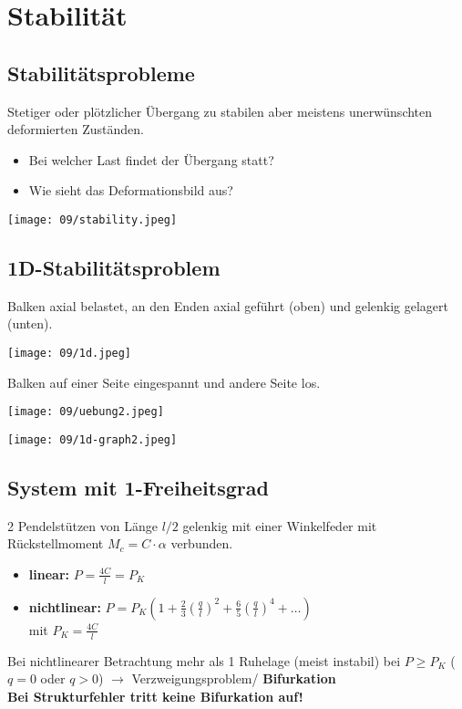 \section{Stabilität}
    \subsection{Stabilitätsprobleme}
        Stetiger oder plötzlicher Übergang zu stabilen aber meistens unerwünschten deformierten Zuständen.\vspace{-1mm}
        \begin{itemize}
            \item Bei welcher Last findet der Übergang statt?
            \item Wie sieht das Deformationsbild aus?
        \end{itemize}
        \begin{center}
            \texttt{[image: 09/stability.jpeg]}
        \end{center}
    \subsection{1D-Stabilitätsproblem}
        Balken axial belastet, an den Enden axial geführt (oben) und gelenkig gelagert (unten).
        \begin{center}
            \texttt{[image: 09/1d.jpeg]}
        \end{center}
\columnbreak
        Balken auf einer Seite eingespannt und andere Seite los.
        \begin{center}
            \texttt{[image: 09/uebung2.jpeg]}
        \end{center}
        \begin{center}
             \texttt{[image: 09/1d-graph2.jpeg]}
        \end{center}
        
    \subsection{System mit 1-Freiheitsgrad}
        2 Pendelstützen von Länge $l/2$ gelenkig mit einer Winkelfeder mit Rückstellmoment $M_c=C\cdot\alpha$ verbunden.
        \begin{itemize}
            \item \textbf{linear:} $P=\frac{4C}{l}=P_K$
            \item \textbf{nichtlinear:} $P=P_K\left(1+\frac{2}{3}\left(\frac{q}{l}\right)^2+\frac{6}{5}\left(\frac{q}{l}\right)^4+\dots\right)$ \\mit $P_K=\frac{4C}{l}$
        \end{itemize}
        Bei nichtlinearer Betrachtung mehr als 1 Ruhelage (meist instabil) bei $P\geqslant P_K$ ($q=0$ oder $q >0$) $\rightarrow$ Verzweigungsproblem/ \textbf{Bifurkation}
        \\\textbf{Bei Strukturfehler tritt keine Bifurkation auf!}
        
